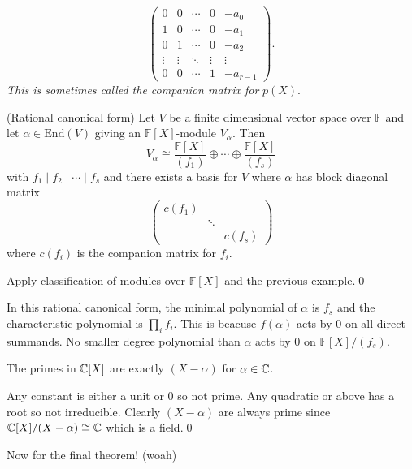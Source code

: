 \documentclass{article}
\newcommand{\F}{\mathbb{F}}
\begin{document}
\[
  \begin{pmatrix}
	  0 & 0 & \cdots & 0 & -a_0 \\
	  1 & 0 & \cdots & 0 & -a_1 \\
	  0 & 1 & \cdots & 0 & -a_2 \\
	  \vdots & \vdots & \ddots & \vdots & \vdots \\
	  0 & 0 & \cdots & 1 & -a_{r-1}
  \end{pmatrix}.
\]
\textit{This is sometimes called the companion matrix for} $ p(X) $.
\begin{theorem}
	(Rational canonical form) Let $ V $ be a finite dimensional vector space over $ \F $ and let $ \alpha\in\mathrm{End}(V) $ giving an $ \F[X] $-module $ V_\alpha $. Then
	\[
		V_\alpha\cong\frac{\F[X]}{(f_1)}\oplus \cdots \oplus \frac{\F[X]}{(f_s)} 
	\]
with $ f_1\mid f_2\mid \cdots\mid f_s $ and there exists a basis for $ V $ where $ \alpha $ has block diagonal matrix
	\[
	  \begin{pmatrix}
		  c(f_1) & & \\
			 & \ddots & \\
			 & & c(f_s)
	  \end{pmatrix}
	\]
	where $ c(f_i) $ is the companion matrix for $ f_i $.
\end{theorem}
\pf Apply classification of modules over $ \F[X] $ and the previous example.\qed
\begin{remark}
	In this rational canonical form, the minimal polynomial of $ \alpha $ is $ f_s $ and the characteristic polynomial is $ \prod_i f_i $. This is beacuse $ f(\alpha) $ acts by 0 on all direct summands. No smaller degree polynomial than $ \alpha $ acts by 0 on $ \F[X]/(f_s) $.
\end{remark}
\begin{lemma}
	The primes in $ \mathbb{C}[X] $ are exactly $ (X-\alpha) $ for $ \alpha\in \mathbb{C} $.
\end{lemma}
\pf Any constant is either a unit or 0 so not prime. Any quadratic or above has a root so not irreducible. Clearly $ (X-\alpha) $ are always prime since $ \mathbb{C}[X]/(X-\alpha)\cong \mathbb{C} $ which is a field.\qed\par
Now for the final theorem! (woah)
\end{document}
